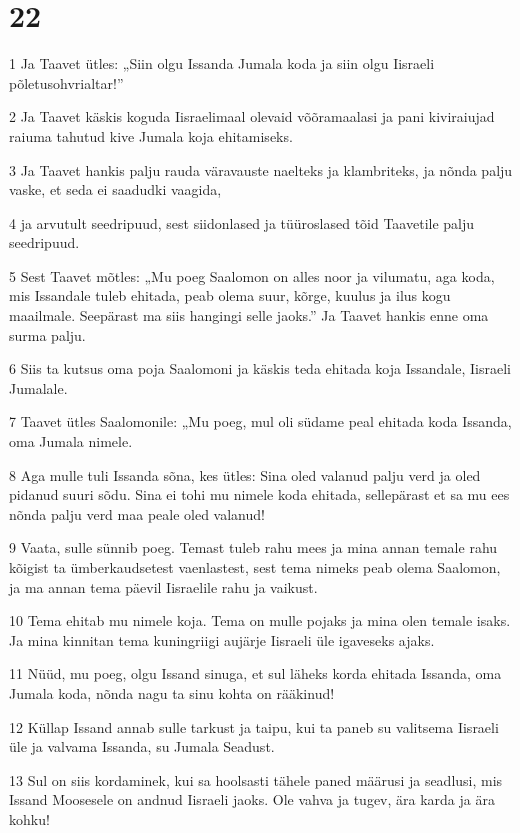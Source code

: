 \chapter{22}

\par 1 Ja Taavet ütles: „Siin olgu Issanda Jumala koda ja siin olgu Iisraeli põletusohvrialtar!”
\par 2 Ja Taavet käskis koguda Iisraelimaal olevaid võõramaalasi ja pani kiviraiujad raiuma tahutud kive Jumala koja ehitamiseks.
\par 3 Ja Taavet hankis palju rauda väravauste naelteks ja klambriteks, ja nõnda palju vaske, et seda ei saadudki vaagida,
\par 4 ja arvutult seedripuud, sest siidonlased ja tüüroslased tõid Taavetile palju seedripuud.
\par 5 Sest Taavet mõtles: „Mu poeg Saalomon on alles noor ja vilumatu, aga koda, mis Issandale tuleb ehitada, peab olema suur, kõrge, kuulus ja ilus kogu maailmale. Seepärast ma siis hangingi selle jaoks.” Ja Taavet hankis enne oma surma palju.
\par 6 Siis ta kutsus oma poja Saalomoni ja käskis teda ehitada koja Issandale, Iisraeli Jumalale.
\par 7 Taavet ütles Saalomonile: „Mu poeg, mul oli südame peal ehitada koda Issanda, oma Jumala nimele.
\par 8 Aga mulle tuli Issanda sõna, kes ütles: Sina oled valanud palju verd ja oled pidanud suuri sõdu. Sina ei tohi mu nimele koda ehitada, sellepärast et sa mu ees nõnda palju verd maa peale oled valanud!
\par 9 Vaata, sulle sünnib poeg. Temast tuleb rahu mees ja mina annan temale rahu kõigist ta ümberkaudsetest vaenlastest, sest tema nimeks peab olema Saalomon, ja ma annan tema päevil Iisraelile rahu ja vaikust.
\par 10 Tema ehitab mu nimele koja. Tema on mulle pojaks ja mina olen temale isaks. Ja mina kinnitan tema kuningriigi aujärje Iisraeli üle igaveseks ajaks.
\par 11 Nüüd, mu poeg, olgu Issand sinuga, et sul läheks korda ehitada Issanda, oma Jumala koda, nõnda nagu ta sinu kohta on rääkinud!
\par 12 Küllap Issand annab sulle tarkust ja taipu, kui ta paneb su valitsema Iisraeli üle ja valvama Issanda, su Jumala Seadust.
\par 13 Sul on siis kordaminek, kui sa hoolsasti tähele paned määrusi ja seadlusi, mis Issand Moosesele on andnud Iisraeli jaoks. Ole vahva ja tugev, ära karda ja ära kohku!
